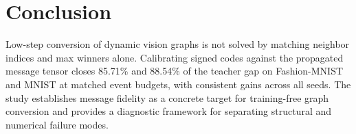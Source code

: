 \documentclass[10pt,twocolumn]{article}
\begin{document}
\section{Conclusion}
Low-step conversion of dynamic vision graphs is not solved by matching neighbor indices and max winners alone. Calibrating signed codes against the propagated message tensor closes 85.71\% and 88.54\% of the teacher gap on Fashion-MNIST and MNIST at matched event budgets, with consistent gains across all seeds. The study establishes message fidelity as a concrete target for training-free graph conversion and provides a diagnostic framework for separating structural and numerical failure modes.



\end{document}
